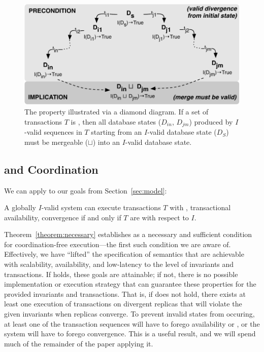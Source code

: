 \begin{figure}
\begin{center}
\includegraphics[width=\columnwidth]{figs/icommute.pdf}\vspace{-1em}
\end{center}
\caption{The \iconfluence property illustrated via a diamond
  diagram. If a set of transactions $T$ is \iconfluent, then all
  database states ($D_{in}$, $D_{jm}$) produced by $I$-valid sequences
  in $T$ starting from an $I$-valid database state ($D_S$) must be
  mergeable ($\sqcup$) into an $I$-valid database state.}
\label{fig:iconfluence}
\end{figure}

\subsection{\iconfluence and Coordination}

We can apply \iconfluence to our goals from Section~\ref{sec:model}:

\begin{theorem}
\label{theorem:necessary}
A globally $I$-valid system can execute transactions $T$ with
\cfreedom, transactional availability, convergence if and only if $T$
are \iconfluent with respect to $I$.
\end{theorem}

Theorem~\ref{theorem:necessary} establishes \iconfluence as a
necessary and sufficient condition for coordination-free
execution---the first such condition we are aware of. Effectively, we
have ``lifted'' the specification of semantics that are achievable
with scalability, availability, and low-latency to the level of
invariants and transactions. If \iconfluence holds, these goals are
attainable; if not, there is no possible implementation or execution
strategy that can guarantee these properties for the provided
invariants and transactions. That is, if \iconfluence does not hold,
there exists at least one execution of transactions on divergent
replicas that will violate the given invariants when replicas
converge. To prevent invalid states from occuring, at least one of the
transaction sequences will have to forego availability or \cfreedom,
or the system will have to forego convergence. This is a useful
result, and we will spend much of the remainder of the paper applying
it.

